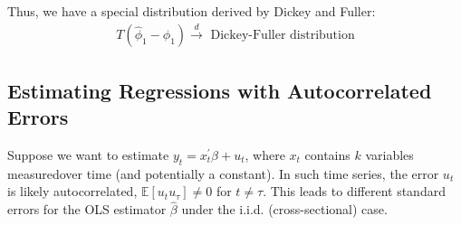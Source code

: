 Thus, we have a special distribution derived by Dickey and Fuller:
\begin{gather*}
    T(\hat{\phi}_1 - \phi_1) \overset{d}{\rightarrow}  \text{ Dickey-Fuller distribution}
\end{gather*}

\subsection{Estimating Regressions with Autocorrelated Errors}
Suppose we want to estimate $y_t = x_t^{\prime} \beta + u_t$,
where $x_t$ contains $k$ variables measuredover time (and potentially a constant).
In such time series, the error $u_t$ is likely autocorrelated, $\mathbb{E}[u_t u_{\tau} ] \neq 0$ for $t \neq \tau$.
This leads to different standard errors for the OLS estimator $\hat{\beta}$ under the i.i.d. (cross-sectional) case.

